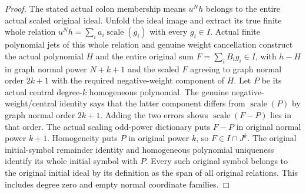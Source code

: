 \begin{proof}
The stated actual colon membership means $u^N h$ belongs to the entire actual
scaled original ideal. Unfold the ideal image and extract its true finite
whole relation $u^Nh=\sum_i a_i\operatorname{scale}(g_i)$ with every
$g_i\in I$. Actual finite polynomial jets of this whole relation and genuine
weight cancellation construct the actual polynomial $H$ and the entire
original sum $F=\sum_i B_i g_i\in I$, with
$h-H$ in graph normal power $N+k+1$ and the scaled $F$ agreeing to graph
normal order $2k+1$ with the required negative-weight component of $H$.
Let $P$ be its actual central degree-$k$ homogeneous polynomial. The genuine
negative-weight/central identity says that the latter component differs
from $\operatorname{scale}(P)$ by graph normal order $2k+1$. Adding the two
errors shows $\operatorname{scale}(F-P)$ lies in that order. The actual scaling
odd-power dictionary puts $F-P$ in original normal power $k+1$.
Homogeneity puts $P$ in original power $k$, so $F\in I\cap J^k$.
The original initial-symbol remainder identity and homogeneous polynomial
uniqueness identify its whole initial symbol with $P$. Every such original
symbol belongs to the original initial ideal by its definition as the span
of all original relations. This includes degree zero and empty normal
coordinate families.
\end{proof}

